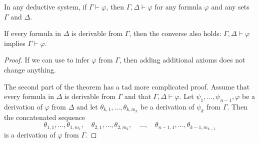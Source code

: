 \begin{proposition}\label{thm:derivation_system_transitivity}
  In any deductive system, if \( \Gamma \vdash \varphi \), then \( \Gamma, \Delta \vdash \varphi \) for any formula \( \varphi \) and any sets \( \Gamma \) and \( \Delta \).

  If every formula in \( \Delta \) is derivable from \( \Gamma \), then the converse also holds: \( \Gamma, \Delta \vdash \varphi \) implies \( \Gamma \vdash \varphi \).
\end{proposition}
\begin{proof}
  If we can use  to infer \( \varphi \) from \( \Gamma \), then adding additional axioms does not change anything.

  The second part of the theorem has a tad more complicated proof. Assume that every formula in \( \Delta \) is derivable from \( \Gamma \) and that \( \Gamma, \Delta \vdash \varphi \). Let \( \psi_1, \ldots, \psi_{n-1}, \varphi \) be a derivation of \( \varphi \) from \( \Delta \) and let \( \theta_{k,1}, \ldots, \theta_{k,m_k} \) be a derivation of \( \psi_k \) from \( \Gamma \). Then the concatenated sequence
  \begin{equation*}
    \theta_{1,1}, \ldots, \theta_{1,m_1}, \quad \theta_{2,1}, \ldots, \theta_{2,m_2}, \quad \ldots, \quad \theta_{n-1,1}, \ldots, \theta_{k-1,m_{k-1}}
  \end{equation*}
  is a derivation of \( \varphi \) from \( \Gamma \).
\end{proof}

